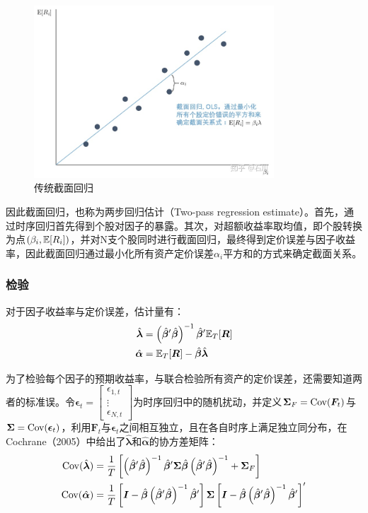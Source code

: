 \documentclass[11pt]{article}
\begin{document}
\begin{figure}[H]
    \centering
    \includegraphics[width=0.8\textwidth]{fig/cs_reg.jpg}
    \caption{传统截面回归}
    \label{fig：cs_reg}
\end{figure}

因此截面回归，也称为两步回归估计（Two-pass regression estimate）。首先，通过时序回归首先得到个股对因子的暴露。其次，对超额收益率取均值，即个股转换为点$(\beta_i,\mathbb{E}[R_i])$，并对N支个股同时进行截面回归，最终得到定价误差与因子收益率，因此截面回归通过最小化所有资产定价误差$\alpha_i$平方和的方式来确定截面关系。

\subsubsection{检验}

对于因子收益率与定价误差，估计量有：
\begin{align*}
    \hat{\bm{\lambda}} &= \left( \hat{\bm{\beta}}' \hat{\bm{\beta}}\right)^{-1} \hat{\bm{\beta}}' \mathbb{E}_T[\bm{R}] \\
    \hat{\bm{\alpha}} &= \mathbb{E}_T[\bm{R}] - \hat{\bm{\beta}} \hat{\bm{\lambda}}
\end{align*}

为了检验每个因子的预期收益率，与联合检验所有资产的定价误差，还需要知道两者的标准误。令$\bm{\epsilon}_t = \begin{bmatrix} \epsilon_{1,t} \\ \vdots \\ \epsilon_{N,t} \end{bmatrix}$为时序回归中的随机扰动，并定义$\bm{\Sigma}_F = \operatorname{Cov}(\bm{F}_t)$与$\bm{\Sigma} = \operatorname{Cov}(\bm{\epsilon}_t)$，利用$\bm{F}_t$与$\bm{\epsilon}_t$之间相互独立，且在各自时序上满足独立同分布，在Cochrane（2005）中给出了$\hat{\bm{\lambda}}$和$\hat{\bm{\alpha}}$的协方差矩阵：
\begin{align*}
    \operatorname{Cov}(\hat{\bm{\lambda}}) &= \frac{1}{T} \left[ \left(\hat{\bm{\beta}}'\hat{\bm{\beta}}\right)^{-1} \hat{\bm{\beta}}' \bm{\Sigma} \hat{\bm{\beta}} \left(\hat{\bm{\beta}}'\hat{\bm{\beta}}\right)^{-1} + \bm{\Sigma}_{F} \right] \\
    \operatorname{Cov}(\hat{\bm{\alpha}}) &= \frac{1}{T} \left[ \bm{I} - \hat{\bm{\beta}} \left(\hat{\bm{\beta}}'\hat{\bm{\beta}}\right)^{-1} \hat{\bm{\beta}}' \right] \bm{\Sigma} \left[ \bm{I} - \hat{\bm{\beta}} \left(\hat{\bm{\beta}}'\hat{\bm{\beta}}\right)^{-1} \hat{\bm{\beta}}' \right]'
\end{align*}
\end{document}
